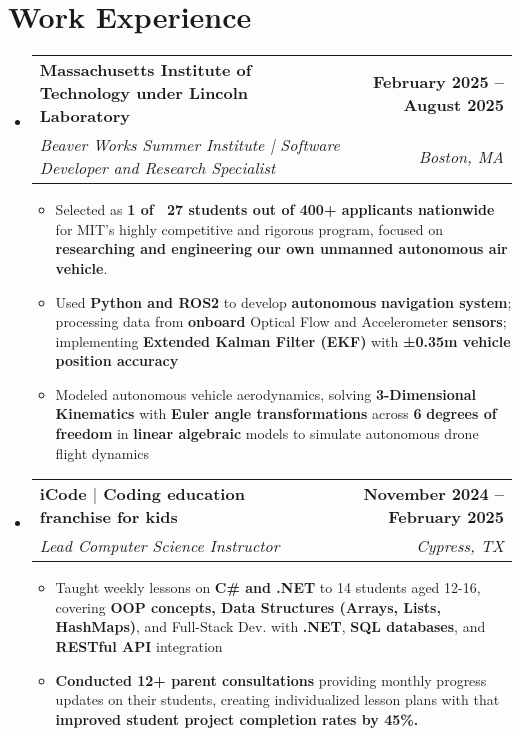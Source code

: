 \documentclass[letterpaper,11pt]{article}
\makeatletter
\newcommand{\resumeItem}[1]{
  \item\small{
    {#1 \vspace{0pt}}
  }
}
\newcommand{\resumeSubheading}[4]{
  \vspace{-2pt}\item
    \begin{tabular*}{1.0\textwidth}[t]{l@{\extracolsep{\fill}}r}
      \textbf{#1} & \textbf{\small #2} \\
      \textit{\small#3} & \textit{\small #4} \\
    \end{tabular*}\vspace{-7pt}
}
\newcommand{\resumeSubHeadingListStart}{\begin{itemize}[leftmargin=0.0in, label={}]}
\newcommand{\resumeSubHeadingListEnd}{\end{itemize}}\vspace{0pt}
\newcommand{\resumeItemListStart}{\begin{itemize}}
\newcommand{\resumeItemListEnd}{\end{itemize}\vspace{-5pt}}
\makeatother
\begin{document}
\section{Work Experience}
    \resumeSubHeadingListStart
                \resumeSubheading{Massachusetts Institute of Technology under Lincoln Laboratory}{February 2025 -- August 2025}{Beaver Works Summer Institute | Software Developer and Research Specialist}{Boston, MA} 
                \resumeItemListStart
                    \resumeItem{Selected as \textbf{1 of ~27 students out of 400+ applicants nationwide} for MIT’s highly competitive
and rigorous program,  focused on \textbf{researching and engineering our own unmanned autonomous air vehicle}.}
                    \resumeItem{Used \textbf{Python and ROS2} to develop \textbf{autonomous} \textbf{navigation system}; processing data from \textbf{onboard} Optical Flow and Accelerometer \textbf{sensors}; implementing \textbf{Extended Kalman Filter (EKF)}  with \textbf{±0.35m vehicle position accuracy}}
                    \resumeItem{Modeled autonomous vehicle aerodynamics, solving \textbf{3-Dimensional Kinematics} with \textbf{Euler angle transformation}\textbf{s} across \textbf{6} \textbf{degrees of freedom} in \textbf{linear algebraic} models to simulate autonomous drone flight dynamics}
                    \resumeItemListEnd
            \resumeSubheading{iCode $|$ Coding education franchise for kids}{November 2024 -- February 2025}{Lead Computer Science Instructor}{Cypress, TX} 
                \resumeItemListStart
                    \resumeItem{Taught weekly lessons on \textbf{C\# and .NET} to 14 students aged 12-16, covering \textbf{OOP concepts, Data Structures (Arrays, Lists, HashMaps)}, and Full-Stack Dev. with \textbf{.NET}, \textbf{SQL databases}, and \textbf{RESTful API} integration}
                    \resumeItem{\textbf{Conducted 12+ parent consultations }providing monthly progress updates on their students, creating individualized lesson plans with that \textbf{improved student project completion rates by 45\%.}}
                    
                    \resumeItemListEnd
    
    \resumeSubHeadingListEnd
    \vspace{-12pt}
    
\end{document}
